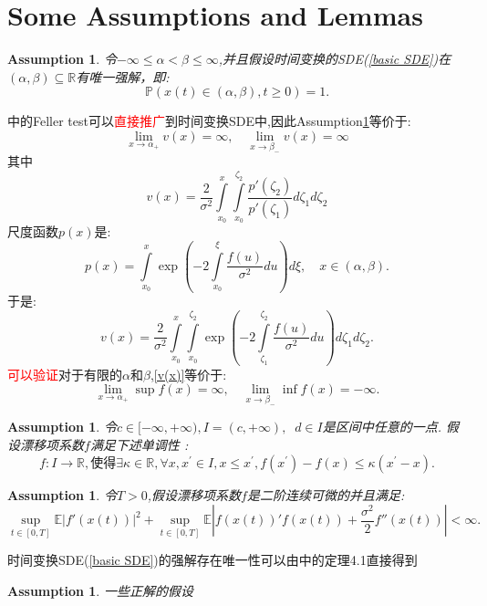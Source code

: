 \documentclass[12pt,final]{article}
\numberwithin{equation}{section}
\numberwithin{figure}{section}
\numberwithin{table}{section}
\theoremstyle{plain}
\newtheorem{assumption}[theorem]{Assumption} %
\theoremstyle{definition}
\theoremstyle{remark}
\begin{document}
\section{Some Assumptions and Lemmas}
\begin{assumption}\label{assum1}
	令$-\infty\leq\alpha<\beta\leq\infty$,并且假设时间变换的SDE(\ref{basic SDE})在$(\alpha,\beta)\subseteq\mathbb{R}$有唯一强解，即:$$\mathbb{P}(x(t)\in(\alpha,\beta), t\geq0)=1.$$
\end{assumption}
\cite{KaratzasShreveBM}中的Feller test可以\textcolor{red}{直接推广}到时间变换SDE中,因此Assumption\ref{assum1}等价于:
\begin{equation}\label{v(x)}
	\lim\limits_{x\to\alpha_+}v(x)=\infty,\quad\lim\limits_{x\to\beta_-}v(x)=\infty
\end{equation}
其中
$$v(x)=\frac{2}{\sigma^2}\int\limits_{x_0}^x\int\limits_{x_0}^{\zeta_2}\frac{p'(\zeta_2)}{p'(\zeta_1)}d\zeta_1d\zeta_2$$
尺度函数$p(x)$是:
$$p(x)=\int\limits_{x_0}^x\exp\left(-2\int\limits_{x_0}^\xi\frac{f(u)}{\sigma^2}du\right)d\xi,\quad x\in(\alpha,\beta).$$
于是:$$v(x)=\frac{2}{\sigma^2}\int\limits_{x_0}^x\int\limits_{x_0}^{\zeta_2}\exp\left(-2\int\limits_{\zeta_1}^{\zeta_2}\frac{f(u)}{\sigma^2} du\right)d\zeta_1d\zeta_2.$$
\textcolor{red}{可以验证}对于有限的$\alpha$和$\beta$,\eqref{v(x)}等价于:$$\lim\limits_{x\to\alpha_+}\sup f(x)=\infty,\quad\lim\limits_{x\to\beta_-}\inf f(x)=-\infty.$$
\begin{assumption}\label{单调}
	令$c\in[-\infty,+\infty),I=(c,+\infty),\operatorname{}d\in I$是区间中任意的一点. 假设漂移项系数$f$满足下述单调性 :
	\begin{equation}
		f:I\to\mathbb{R}  , 使得 \exists\kappa\in\mathbb{R},\forall x,x^\prime\in I,x\leq x^\prime,f(x^\prime)-f(x)\leq\kappa(x^\prime-x).
	\end{equation}
\end{assumption}
\begin{assumption}\label{assum3}
	令$T>0$,假设漂移项系数$f$是二阶连续可微的并且满足:
	\begin{equation}
		\sup\limits_{t\in[0,T]}\mathbb{E}\left|f'(x(t))\right|^2+
		\sup\limits_{t\in[0,T]}\mathbb{E}\left|f(x(t))'f(x(t))+
		\frac{\sigma^2}2f''(x(t))\right|<\infty.
	\end{equation}
\end{assumption}
时间变换SDE(\ref{basic SDE})的强解存在唯一性可以由\cite{kobayashi2011stochastic}中的定理4.1直接得到
\begin{assumption}
	一些正解的假设
\end{assumption}
\end{document}
